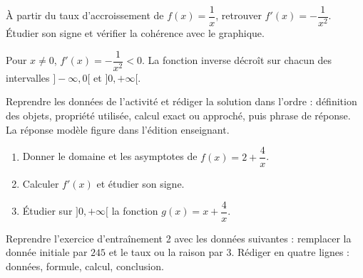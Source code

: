 \begin{activite}
À partir du taux d'accroissement de $f(x)=\dfrac1x$, retrouver $f'(x)=-\dfrac1{x^2}$. Étudier son signe et vérifier la cohérence avec le graphique.

\end{activite}

\begin{traceecrite}Pour $x\neq0$, $f'(x)=-\dfrac1{x^2}<0$. La fonction inverse décroît sur chacun des intervalles $]-\infty,0[$ et $]0,+\infty[$.\end{traceecrite}

\begin{exemple}
Reprendre les données de l'activité et rédiger la solution dans l'ordre : définition des objets, propriété utilisée, calcul exact ou approché, puis phrase de réponse. La réponse modèle figure dans l'édition enseignant.
\end{exemple}

\begin{exercice}[-- essentiel]
\begin{enumerate}\item Donner le domaine et les asymptotes de $f(x)=2+\dfrac{4}x$.\item Calculer $f'(x)$ et étudier son signe.\item Étudier sur $]0,+\infty[$ la fonction $g(x)=x+\dfrac{4}x$.\end{enumerate}
\end{exercice}


\begin{dm}Reprendre l'exercice d'entraînement 2 avec les données suivantes : remplacer la donnée initiale par $245$ et le taux ou la raison par $3$. Rédiger en quatre lignes : données, formule, calcul, conclusion.\end{dm}


